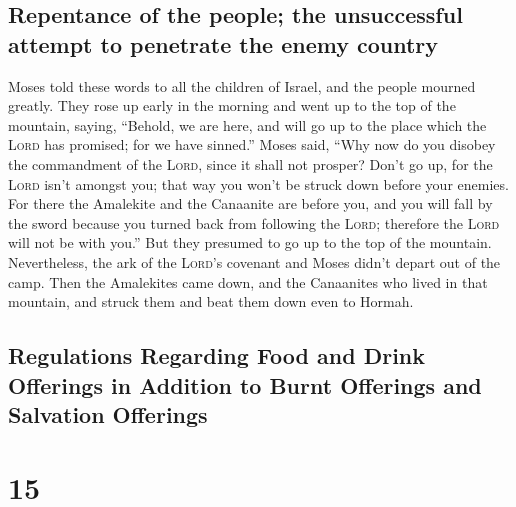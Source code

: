 \hypertarget{repentance-of-the-people-the-unsuccessful-attempt-to-penetrate-the-enemy-country}{%
\subsection{Repentance of the people; the unsuccessful attempt to
penetrate the enemy
country}\label{repentance-of-the-people-the-unsuccessful-attempt-to-penetrate-the-enemy-country}}

 Moses told these words to all the children of Israel,
and the people mourned greatly.  They rose up early in
the morning and went up to the top of the mountain, saying, ``Behold, we
are here, and will go up to the place which the \textsc{Lord} has
promised; for we have sinned.''  Moses said, ``Why now do
you disobey the commandment of the \textsc{Lord}, since it shall not
prosper?  Don't go up, for the \textsc{Lord} isn't
amongst you; that way you won't be struck down before your enemies.
 For there the Amalekite and the Canaanite are before
you, and you will fall by the sword because you turned back from
following the \textsc{Lord}; therefore the \textsc{Lord} will not be
with you.''  But they presumed to go up to the top of the
mountain. Nevertheless, the ark of the \textsc{Lord}'s covenant and
Moses didn't depart out of the camp.  Then the Amalekites
came down, and the Canaanites who lived in that mountain, and struck
them and beat them down even to Hormah.

\hypertarget{regulations-regarding-food-and-drink-offerings-in-addition-to-burnt-offerings-and-salvation-offerings}{%
\subsection{Regulations Regarding Food and Drink Offerings in Addition
to Burnt Offerings and Salvation
Offerings}\label{regulations-regarding-food-and-drink-offerings-in-addition-to-burnt-offerings-and-salvation-offerings}}

\hypertarget{section-14}{%
\section{15}\label{section-14}}

